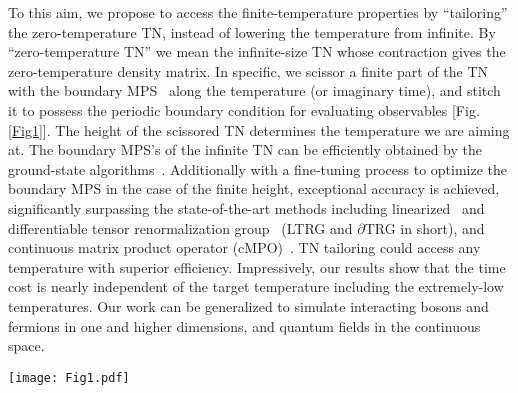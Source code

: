 \documentclass[aps,prl,twocolumn,superscriptaddress,a4paper,english,longbibliography]{revtex4-1}
\begin{document}
To this aim, we propose to access the finite-temperature properties by ``tailoring'' the zero-temperature TN, instead of lowering the temperature from infinite. By ``zero-temperature TN'' we mean the infinite-size TN whose contraction gives the zero-temperature density matrix. In specific, we scissor a finite part of the TN with the boundary MPS~\cite{PhysRevLett.75.3537, 1992CMaPh.144..443F} along the temperature (or imaginary time), and stitch it to possess the periodic boundary condition for evaluating observables [Fig. \ref{Fig1}]. The height of the scissored TN determines the temperature we are aiming at. The boundary MPS's of the infinite TN can be efficiently obtained by the ground-state algorithms~\cite{PhysRevLett.69.2863, PhysRevB.48.10345, PhysRevLett.91.147902, PhysRevLett.93.040502, PhysRevB.80.094403, PhysRevE.93.053310, PhysRevB.96.155120}. Additionally with a fine-tuning process to optimize the boundary MPS in the case of the finite height, exceptional accuracy is achieved, significantly surpassing the state-of-the-art methods including linearized~\cite{PhysRevLett.106.127202} and differentiable tensor renormalization group~\cite{PhysRevB.101.220409} (LTRG and $\partial$TRG in short), and continuous matrix product operator (cMPO)~\cite{PhysRevLett.125.170604}. TN tailoring could access any temperature with superior efficiency. Impressively, our results show that the time cost is nearly independent of the target temperature including the extremely-low temperatures. Our work can be generalized to simulate interacting bosons and fermions in one and higher dimensions, and quantum fields in the continuous space.

\begin{figure*}[tbp]
	\centering
	\texttt{[image: Fig1.pdf]}
	\caption{(Color online) In (a) we show the infinite square tensor network representing the density matrix $e^{-\hat{H}/T}$ of the quantum system at $T \to 0$ in the thermodynamic limit. In (b) we show the boundary MPS's ($\langle L|$ and $|R\rangle$) of the infinite TN in (a) along temporal (vertical) direction. Then scissoring $K$ layers from the TN along the imaginary-time direction. (c) A finite part with $K$ layers is scissored from the infinite TN in (b), and stitched to possess the periodic boundary condition alone the temporal direction. It approximately represents the finite-temperature reduced density operator with $T=1 / K\cdot\tau$. In (d) we illustrate $\langle L|\hat{T}|R \rangle$ [Eq. (\ref{app-eq-f})] for fine-tuning.}
	\label{Fig1}
\end{figure*}
\end{document}
